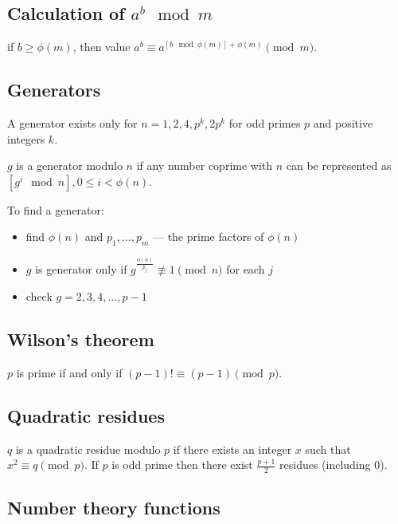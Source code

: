 \subsection{Calculation of $a^b \mod m$}
if $b \ge \phi(m)$, then value $a^b \equiv a^{\left[b \mod \phi(m)\right] + \phi(m)} \pmod m$.

\subsection{Generators}
A generator exists only for $n = 1, 2, 4, p^k, 2p^k$ for odd primes $p$ and positive integers $k$. 

$g$ is a generator modulo $n$ if any number coprime with $n$ can be represented as $\left[ g^i \mod n \right], 0 \le i < \phi(n)$.

To find a generator:
\begin{itemize}
\item find $\phi(n)$ and $p_1, ..., p_m$ --- the prime factors of $\phi(n)$
\item $g$ is generator only if $g^{\frac{\phi(n)}{p_j}} \not\equiv 1 \pmod n$ for each $j$
\item check $g = 2, 3, 4, ..., p - 1$
\end{itemize}

\subsection{Wilson's theorem}
$p$ is prime if and only if $(p - 1)! \equiv (p - 1) \pmod p$.

\subsection{Quadratic residues}
$q$ is a quadratic residue modulo $p$ if there exists an integer $x$ such that $x^2 \equiv q \pmod p$.
If $p$ is odd prime then there exist $\frac{p + 1}{2}$ residues (including 0).

\subsection{Number theory functions}

